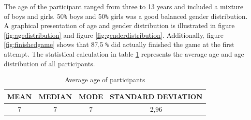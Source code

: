 The age of the participant ranged from three to 13 years and included a mixture of boys and girls. 50\texttt{\%} boys and 50\texttt{\%} girls was a good balanced gender distribution. A graphical presentation of age and gender distribution is illustrated in figure \ref{fig:agedistribution} and figure \ref{fig:genderdistribution}. Additionally, figure \ref{fig:finishedgame} shows that 87,5 \texttt{\%} did actually finished the game at the first attempt. The statistical calculation in table  \ref{tab:agestatistic} represents the average age and age distribution of all participants.

\renewcommand{\arraystretch}{1.5}

\begin{table}[!ht]
    \centering
    \begin{tabular}{c|c|c|c}
    \hline
        \multicolumn{1}{|c|}{MEAN} &
        \multicolumn{1}{c|}{MEDIAN} &
        \multicolumn{1}{c|}{MODE} &
        \multicolumn{1}{c|}{STANDARD DEVIATION}\\ \hline
       \multicolumn{1}{|c|}{7} &
        \multicolumn{1}{c|}{7} &
        \multicolumn{1}{c|}{7} &
        \multicolumn{1}{c|}{2,96} \\ \hline
    \end{tabular}
    \caption{Average age of participants}
    \label{tab:agestatistic}
\end{table}



